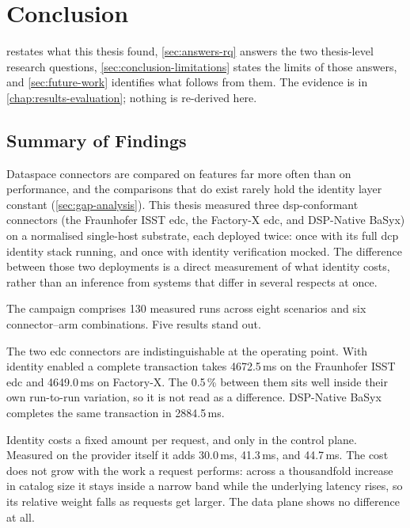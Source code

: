 \chapter{Conclusion}\label{chap:conclusion}

 restates what this thesis found, \cref{sec:answers-rq} answers
the two thesis-level research questions, \cref{sec:conclusion-limitations} states the
limits of those answers, and \cref{sec:future-work} identifies what follows from them. The
evidence is in \cref{chap:results-evaluation}; nothing is re-derived here.


\section{Summary of Findings}\label{sec:summary-findings}

Dataspace connectors are compared on features far more often than on performance, and the
comparisons that do exist rarely hold the identity layer constant
(\cref{sec:gap-analysis}). This thesis measured three \gls{dsp}-conformant connectors (the Fraunhofer ISST \gls{edc}, the Factory-X \gls{edc}, and DSP-Native BaSyx) on a
normalised single-host substrate, each deployed twice: once with its full \gls{dcp}
identity stack running, and once with identity verification mocked. The difference between
those two deployments is a direct measurement of what identity costs, rather than an
inference from systems that differ in several respects at once.

The campaign comprises 130 measured runs across eight scenarios and six connector--arm
combinations. Five results stand out.

The two \gls{edc} connectors are indistinguishable at the operating point. With identity
enabled a complete transaction takes 4672.5\,ms on the Fraunhofer ISST \gls{edc} and
4649.0\,ms on Factory-X. The 0.5\,\% between them sits well inside their own run-to-run
variation, so it is not read as a difference. DSP-Native BaSyx completes the same
transaction in 2884.5\,ms.

Identity costs a fixed amount per request, and only in the control plane. Measured on the
provider itself it adds 30.0\,ms, 41.3\,ms, and 44.7\,ms. The cost does not grow with the
work a request performs: across a thousandfold increase in catalog size it stays inside a
narrow band while the underlying latency rises, so its relative weight falls as requests
get larger. The data plane shows no difference at all.

